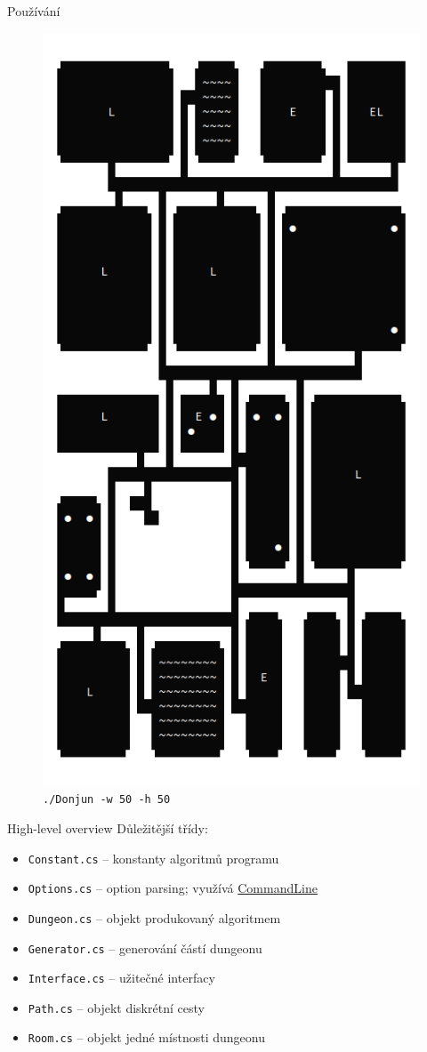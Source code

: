 \documentclass[czech]{beamer}
\begin{document}
\begin{frame}{Používání}
\begin{figure}
\begin{minipage}{.5\textwidth}
			\includegraphics[width=.6\linewidth]{../img/50x50.png}
			\texttt{./Donjun -w 50 -h 50}
		\end{minipage}
		\end{figure}
	\end{frame}
	
	\begin{frame}{High-level overview}
		Důležitější třídy:
		\begin{itemize}
			\item \texttt{Constant.cs} -- konstanty algoritmů programu
			\item \texttt{Options.cs} -- option parsing; využívá \href{https://github.com/commandlineparser/commandline}{CommandLine}
			\item \texttt{Dungeon.cs} -- objekt produkovaný algoritmem
			\item \texttt{Generator.cs} -- generování částí dungeonu
			\item \texttt{Interface.cs} -- užitečné interfacy
			\item \texttt{Path.cs} -- objekt diskrétní cesty
			\item \texttt{Room.cs} -- objekt jedné místnosti dungeonu
		\end{itemize}
	\end{frame}
	
\end{document}
